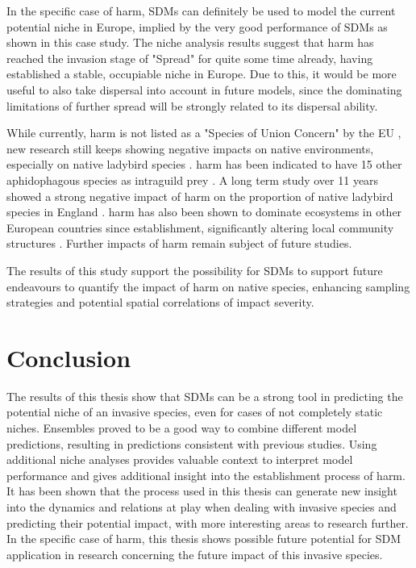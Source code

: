 \documentclass[12pt,a4paper]{article}
\begin{document}
In the specific case of \gls{harm}, SDMs can definitely be used to model the current potential niche in Europe, implied by the very good performance of SDMs as shown in this case study.
The niche analysis results suggest that \gls{harm} has reached the invasion stage of "Spread" for quite some time already, having established a stable, occupiable niche in Europe.
Due to this, it would be more useful to also take dispersal into account in future models, since the dominating limitations of further spread will be strongly related to its dispersal ability.

While currently, \gls{harm} is not listed as a "Species of Union Concern" by the EU \autocite{EU2020speciesofunionconcern}, new research still keeps showing negative impacts on native environments, especially on native ladybird species \autocite{brown2022harmimpactigp}.
\gls{harm} has been indicated to have 15 other aphidophagous species as intraguild prey \autocite{lucas2007axyridisintra}.
A long term study over 11 years showed a strong negative impact of \gls{harm} on the proportion of native ladybird species in England \autocite{brown2018harmlongterm}.
\gls{harm} has also been shown to dominate ecosystems in other European countries since establishment, significantly altering local community structures \autocite{masetti2018harmitaly, honek2019harmczech}.
Further impacts of \gls{harm} remain subject of future studies.

The results of this study support the possibility for SDMs to support future endeavours to quantify the impact of \gls{harm} on native species, enhancing sampling strategies and potential spatial correlations of impact severity.

\clearpage
\section{Conclusion} \label{sec:conclusion}
The results of this thesis show that SDMs can be a strong tool in predicting the potential niche of an invasive species, even for cases of not completely static niches.
Ensembles proved to be a good way to combine different model predictions, resulting in predictions consistent with previous studies.
Using additional niche analyses provides valuable context to interpret model performance and gives additional insight into the establishment process of \gls{harm}.
It has been shown that the process used in this thesis can generate new insight into the dynamics and relations at play when dealing with invasive species and predicting their potential impact, with more interesting areas to research further.
In the specific case of \gls{harm}, this thesis shows possible future potential for SDM application in research concerning the future impact of this invasive species.
\end{document}
